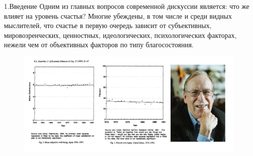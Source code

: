 \documentclass[aspectratio=169]{beamer}
\title{}
\subtitle{Влияние макроэкономических показателей страны на уровень индивидуального благополучия граждан}
\author{Заостровский Всеволод, Сулейманов Асхаб, Черепахин Иван}
\institute{Vega Institute Foundation, Мехмат МГУ}
\date{}
\begin{document}
\maketitle

    

    

\begin{frame}{1.Введение}
\small
   Одним из главных вопросов современной дискуссии является: что же влияет на уровень счастья? Многие убеждены, в том числе и среди видных мыслителей, что счастье в первую очередь зависит от субъективных, мировозренческих, ценностных, идеологических, психологических факторах, нежели чем от объективных факторов по типу благосостояния.

   \begin{figure} \label{hompic}
            \centering
            \includegraphics[scale=0.5]{EasterlinU_3_1200x550.png}
    \end{figure}
     
 \end{frame}
\end{document}
